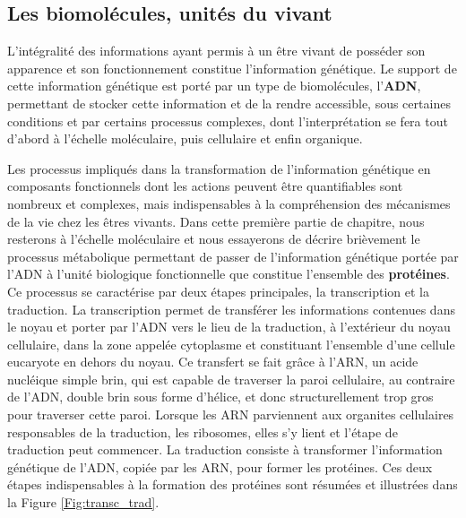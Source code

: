 
\subsection{Les biomolécules, unités du vivant}

L'intégralité des informations ayant permis à un être vivant de posséder son apparence et son fonctionnement constitue l'information génétique. Le support de cette information génétique est porté par un type de biomolécules, l'\textbf{ADN}, permettant de stocker cette information et de la rendre accessible, sous certaines conditions et par certains processus complexes, dont l'interprétation se fera tout d'abord à l'échelle moléculaire, puis cellulaire et enfin organique.

Les processus impliqués dans la transformation de l'information génétique en composants fonctionnels dont les actions peuvent être quantifiables sont nombreux et complexes, mais indispensables à la compréhension des mécanismes de la vie chez les êtres vivants. Dans cette première partie de chapitre, nous resterons à l'échelle moléculaire et nous essayerons de décrire brièvement le processus métabolique permettant de passer de l'information génétique portée par l'ADN à l'unité biologique fonctionnelle que constitue l'ensemble des \textbf{protéines}.
Ce processus se caractérise par deux étapes principales, la transcription et la traduction. La transcription permet de transférer les informations contenues dans le noyau et porter par l'ADN vers le lieu de la traduction, à l'extérieur du noyau cellulaire, dans la zone appelée cytoplasme et constituant l'ensemble d'une cellule eucaryote en dehors du noyau. Ce transfert se fait grâce à l'ARN, un acide nucléique simple brin, qui est capable de traverser la paroi cellulaire, au contraire de l'ADN, double brin sous forme d'hélice, et donc structurellement trop gros pour traverser cette paroi. Lorsque les ARN parviennent aux organites cellulaires responsables de la traduction, les ribosomes, elles s'y lient et l'étape de traduction peut commencer. La traduction consiste à transformer l'information génétique de l'ADN, copiée par les ARN, pour former les protéines. Ces deux étapes indispensables à la formation des protéines sont résumées et illustrées dans la Figure \ref{Fig:transc_trad}.

